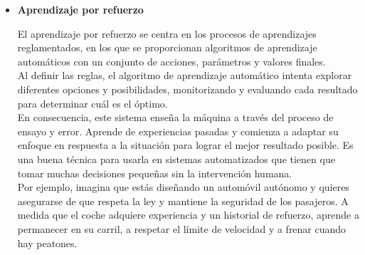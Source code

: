 \documentclass[runningheads,a4paper]{llncs}
\begin{document}
\begin{itemize}
Aqu\'i, el algoritmo de aprendizaje autom\'atico estudia los datos para identificar patrones. No hay una clave de respuesta o un operador humano para proporcionar instrucci\'on. En cambio, la m\'aquina determina las correlaciones y las relaciones mediante el an\'alisis de los datos disponibles.\\
En un proceso de aprendizaje no supervisado, se deja que el algoritmo de aprendizaje autom\'atico interprete grandes conjuntos de datos y dirija esos datos en consecuencia. As\'i, el algoritmo intenta organizar esos datos de alguna manera para describir su estructura. Esto podr\'ia significar la necesidad de agrupar los datos en grupos u organizarlos de manera que se vean m\'as organizados.\\
A medida que eval\'ua m\'as datos, su capacidad para tomar decisiones sobre los mismos mejora gradualmente y se vuelve m\'as refinada. Esta t\'ecnica es \'util cuando no sabes c\'omo ser\'a el resultado.

Por ejemplo, imagina que proporcionas datos de clientes y quieres crear segmentos de clientes a los que les gustan productos similares. Los datos que proporcionas no est\'an etiquetados y las etiquetas de los resultados se generan en funci\'on de las similitudes detectadas entre los puntos de datos.\\

Dentro de esta t\'ecnica algunos de los algoritmos m\'as utilizados son:
\begin{itemize}
\item Algoritmos de Clustering.
\item Algoritmos de Reducci\'on de dimensionalidad.
\end{itemize}

\newpage
\item {\bf Aprendizaje por refuerzo}

El aprendizaje por refuerzo se centra en los procesos de aprendizajes reglamentados, en los que se proporcionan algoritmos de aprendizaje autom\'aticos con un conjunto de acciones, par\'ametros y valores finales.\\
Al definir las reglas, el algoritmo de aprendizaje autom\'atico intenta explorar diferentes opciones y posibilidades, monitorizando y evaluando cada resultado para determinar cu\'al es el \'optimo.\\
En consecuencia, este sistema enseña la m\'aquina a trav\'es del proceso de ensayo y error. Aprende de experiencias pasadas y comienza a adaptar su enfoque en respuesta a la situaci\'on para lograr el mejor resultado posible. Es una buena t\'ecnica para usarla en sistemas automatizados que tienen que tomar muchas decisiones pequeñas sin la intervenci\'on humana.\\
Por ejemplo, imagina que est\'as diseñando un autom\'ovil aut\'onomo y quieres asegurarse de que respeta la ley y mantiene la seguridad de los pasajeros. A medida que el coche adquiere experiencia y un historial de refuerzo, aprende a permanecer en su carril, a respetar el l\'imite de velocidad y a frenar cuando hay peatones.

\end{itemize}
\end{document}
